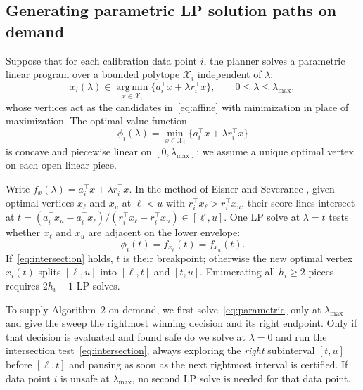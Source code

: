 \documentclass[a4paper,10pt]{article}
\theoremstyle{plain}
\theoremstyle{remark}
\begin{document}
\subsection{Generating parametric LP solution paths on demand}\label{sec:lazy}

Suppose that for each calibration data point $i$, the planner solves a parametric linear program over a bounded polytope $\mathcal X_i$ independent of $\lambda$:
\begin{equation}\label{eq:parametric}
 x_i(\lambda)\in\operatorname*{arg\,min}_{x\in\mathcal X_i}
 \bigl\{a_i^\top x+\lambda r_i^\top x\bigr\},\qquad 0\le\lambda\le\lambda_{\max},
\end{equation}
whose vertices act as the candidates in~\eqref{eq:affine} with minimization in place of maximization. The optimal value function
\begin{equation}\label{eq:valuepath}
 \phi_i(\lambda)=\min_{x\in\mathcal X_i}\bigl\{a_i^\top x+\lambda r_i^\top x\bigr\}
\end{equation}
is concave and piecewise linear on $[0,\lambda_{\max}]$; we assume a unique optimal vertex on each open linear piece.

Write $f_x(\lambda)=a_i^\top x+\lambda r_i^\top x$. In the method of Eisner and Severance \cite{eisner}, given optimal vertices $x_\ell$ and $x_u$ at $\ell<u$ with $r_i^\top x_\ell>r_i^\top x_u$, their score lines intersect at $t=(a_i^\top x_u-a_i^\top x_\ell)/(r_i^\top x_\ell-r_i^\top x_u)\in[\ell,u]$. One LP solve at $\lambda=t$ tests whether $x_\ell$ and $x_u$ are adjacent on the lower envelope:
\begin{equation}\label{eq:intersection}
 \phi_i(t)=f_{x_\ell}(t)=f_{x_u}(t).
\end{equation}
If~\eqref{eq:intersection} holds, $t$ is their breakpoint; otherwise the new optimal vertex $x_i(t)$ splits $[\ell,u]$ into $[\ell,t]$ and $[t,u]$. Enumerating all $h_i\ge2$ pieces requires $2h_i-1$ LP solves.

To supply Algorithm~2 on demand, we first solve~\eqref{eq:parametric} only at $\lambda_{\max}$ and give the sweep the rightmost winning decision and its right endpoint. Only if that decision is evaluated and found safe do we solve at $\lambda=0$ and run the intersection test~\eqref{eq:intersection}, always exploring the \emph{right} subinterval $[t,u]$ before $[\ell,t]$ and pausing as soon as the next rightmost interval is certified. If data point $i$ is unsafe at $\lambda_{\max}$, no second LP solve is needed for that data point.
\end{document}
